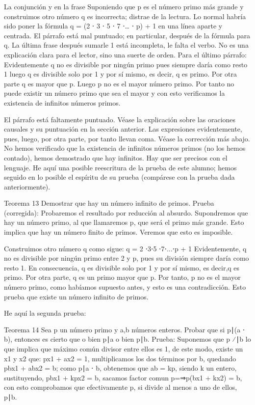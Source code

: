 La conjunción y en la frase Suponiendo que p es el número primo más grande y construimos otro número q es incorrecta; distrae de la lectura.
Lo normal habría sido poner la fórmula q = (2 ⋅ 3 ⋅ 5 ⋅ 7 ⋅… ⋅ p) + 1 en una línea aparte y centrada.
El párrafo está mal puntuado; en particular, después de la fórmula para q.
La última frase después sumarle 1 está incompleta, le falta el verbo. No es una explicación clara para el lector, sino una suerte de orden.
Para el último párrafo:
Evidentemente q no es divisible por ningún primo pues siempre daría como resto 1 luego q es divisible solo por 1 y por sí mismo, es decir, q es primo. Por otra parte q es mayor que p. Luego p no es el mayor número primo. Por tanto no puede existir un número primo que sea el mayor y con esto verificamos la existencia de infinitos números primos.

El párrafo está faltamente puntuado. Véase la explicación sobre las oraciones causales y su puntuación en la sección anterior. Las expresiones evidentemente, pues, luego, por otra parte, por tanto llevan coma. Véase la corrección más abajo.
No hemos verificado que la existencia de infinitos números primos (no los hemos contado), hemos demostrado que hay infinitos. Hay que ser precisos con el lenguaje.
He aquí una posible reescritura de la prueba de este alumno; hemos seguido en lo posible el espíritu de su prueba (compárese con la prueba dada anteriormente).

Teorema 13 Demostrar que hay un número infinito de primos.
Prueba (corregida): Probaremos el resultado por reducción al absurdo. Supondremos que hay un número primo, al que llamaremos p, que será el primo más grande. Esto implica que hay un número finito de primos. Veremos que esto es imposible.

Construimos otro número q como sigue:
q = 2 ⋅3⋅5 ⋅7⋅...⋅p + 1
Evidentemente, q no es divisible por ningún primo entre 2 y p, pues su división siempre daría como resto 1. En consecuencia, q es divisible solo por 1 y por sí mismo, es decir,q es primo. Por otra parte, q es un primo mayor que p. Por tanto, p no es el mayor número primo, como habíamos supuesto antes, y esto es una contradicción. Esto prueba que existe un número infinito de primos.

He aquí la segunda prueba:

Teorema 14 Sea p un número primo y a,b números enteros. Probar que si p∣(a ⋅ b), entonces es cierto que o bien p∣a o bien p∣b.
Prueba: Suponemos que p ⁄∣b lo que implica que máximo común divisor entre ellos es 1, de este modo, existe un x1 y x2 que: px1 + ax2 = 1, multiplicamos los dos términos por b, quedando pbx1 + abx2 = b; como p∣a ⋅ b, obtenemos que ab = kp, siendo k un entero, sustituyendo, pbx1 + kpx2 = b, sacamos factor comun p=⇒p(bx1 + kx2) = b, con esto comprobamos que efectivamente p, si divide al menos a uno de ellos, p∣b.

